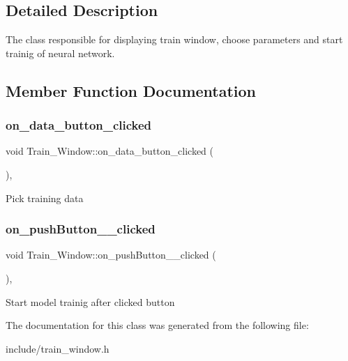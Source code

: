 \subsection{Detailed Description}
The class responsible for displaying train window, choose parameters and start trainig of neural network. 



\subsection{Member Function Documentation}
\mbox{\label{class_train___window_a47d45f384226cde0801d7b44cf41bdea}} 
\subsubsection{\texorpdfstring{on\+\_\+data\+\_\+button\+\_\+clicked}{on\_data\_button\_clicked}}
{\footnotesize\ttfamily void Train\+\_\+\+Window\+::on\+\_\+data\+\_\+button\+\_\+clicked (\begin{DoxyParamCaption}{ }\end{DoxyParamCaption})\hspace{0.3cm}{\ttfamily [private]}, {\ttfamily [slot]}}

Pick training data \mbox{\label{class_train___window_aab0ec830048b674fd6290900eca39b8c}} 
\subsubsection{\texorpdfstring{on\+\_\+push\+Button\+\_\+\_\+clicked}{on\_pushButton\_2\_clicked}}
{\footnotesize\ttfamily void Train\+\_\+\+Window\+::on\+\_\+push\+Button\+\_\+\_\+clicked (\begin{DoxyParamCaption}{ }\end{DoxyParamCaption})\hspace{0.3cm}{\ttfamily [private]}, {\ttfamily [slot]}}

Start model trainig after clicked button 

The documentation for this class was generated from the following file\+:\begin{DoxyCompactItemize}
\item 
include/train\+\_\+window.\+h\end{DoxyCompactItemize}
